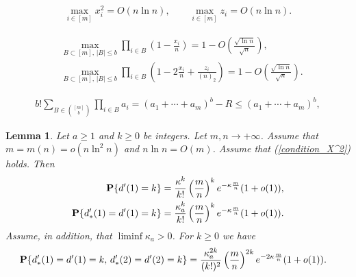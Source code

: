 \documentclass[10pt,a4paper]{amsart}
\newtheorem{lem}{Lemma}
\newcommand{\PP}{{\bf{P}}}
\begin{document}
\begin{align}
\label{2026-01-10+6}
\max_{i\in [m]}x_i^2=O(n\ln n),
\qquad 
\max_{i\in [m]}z_i=O(n\ln n).
\end{align}

\begin{align}
\label{2026-01-10+1}
&
\max_{B\subset [m],\, |B|\le b} \prod_{i\in B}\left(1-\frac{x_i}{n}\right)
=
1-O\left(\frac{\sqrt{\ln n}}{\sqrt{n}}\right),
\\
\label{2026-01-10+2}
&
\max_{B\subset [m],\, |B|\le b} \prod_{i\in B}\left(1-2\frac{x_i}{n}+\frac{z_i}{(n)_2}\right)
=
1-O\left(\frac{\sqrt{\ln n}}{\sqrt{n}}\right).
\end{align}

\begin{align}
\label{Fact1}
b!\sum_{B\in\binom{[m]}{b}}\prod_{i\in B}a_i
=
(a_1+\cdots+a_m)^b
-
R
\le 
(a_1+\cdots+a_m)^b,
\end{align}

\begin{lem}\label{AB+} 
Let $a\ge 1$ and $k\ge 0$ be integers.
Let $m,n\to+\infty$.
 Assume that $m=m(n)=o(n\ln^2n)$ and $n\ln n=O(m)$.  Assume that (\ref{condition_X^2}) holds. Then
 \begin{align}
  \label{2025-09-04}
 \PP\{d'(1)=k\}
 &
 =
 \frac{\kappa^k}{k!}\left(\frac{m}{n}\right)^k e^{-\kappa\frac{m}{n}}
 (1+o(1)),
 \\
 \label{2025-06-21_6+r+r}
 \PP\{d_*'(1)=d'(1)=k\}
 &
 =
 \frac{\kappa_a^k}{k!}
 \left(\frac{m}{n}\right)^k
  e^{-\kappa\frac{m}{n}}
 (1+o(1)).
 \end{align}
 Assume, in addition, that $\liminf\kappa_a>0$.
 For $k\ge 0$ we have 
 \begin{align}
  \label{2025-6-21_9+r}
 \PP\{d_*'(1)=d'(1)=k,\, d_*'(2)=d'(2)=k\}
& =\frac{\kappa_a^{2k}}{(k!)^2}
\left(\frac{m}{n}\right)^{2k}
 e^{-2\kappa\frac{m}{n}}
 (1+o(1)).
 \end{align}
\end{lem}
\end{document}
